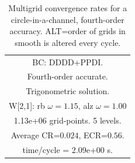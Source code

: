 \begin{table}[hbt]
\begin{center}
{\begin{tabular}{|c|c|c|c|c|}
\multicolumn{5}{|c|}{BC: DDDD+PPDI.}  \\
\multicolumn{5}{|c|}{Fourth-order accurate.}  \\
\multicolumn{5}{|c|}{Trigonometric solution.}  \\
\multicolumn{5}{|c|}{W[2,1]: rb $\omega=1.15$, alz $\omega=1.00$}  \\
\multicolumn{5}{|c|}{1.13e+06 grid-points. 5 levels.}  \\
\multicolumn{5}{|c|}{Average CR=$0.024$, ECR=$0.56$.}  \\
\multicolumn{5}{|c|}{time/cycle = 2.09e+00 s.}  \\
\hline 
\end{tabular}
} %
\end{center}
\caption{Multigrid convergence rates for a circle-in-a-channel, fourth-order accuracy.
  ALT=order of grids in smooth is altered every cycle.}
 \label{tab:cic4} 
\end{table}



